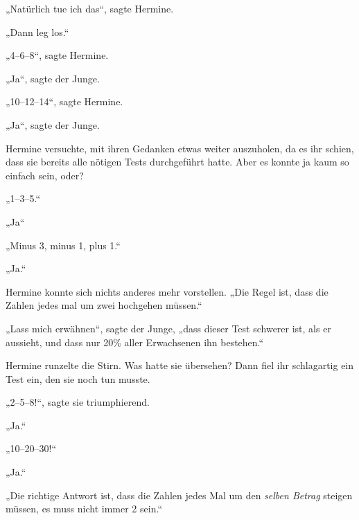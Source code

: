 „Natürlich tue ich das“, sagte Hermine.

„Dann leg los.“

„4–6–8“, sagte Hermine.

„Ja“, sagte der Junge.

„10–12–14“, sagte Hermine.

„Ja“, sagte der Junge.

Hermine versuchte, mit ihren Gedanken etwas weiter auszuholen, da es ihr schien, dass sie bereits alle nötigen Tests durchgeführt hatte. Aber es konnte ja kaum so einfach sein, oder?

„1–3–5.“

„Ja“

„Minus 3, minus 1, plus 1.“

„Ja.“

Hermine konnte sich nichts anderes mehr vorstellen. „Die Regel ist, dass die Zahlen jedes mal um zwei hochgehen müssen.“

„Lass mich erwähnen“, sagte der Junge, „dass dieser Test schwerer ist, als er aussieht, und dass nur 20\% aller Erwachsenen ihn bestehen.“

Hermine runzelte die Stirn. Was hatte sie übersehen? Dann fiel ihr schlagartig ein Test ein, den sie noch tun musste.

„2–5–8!“, sagte sie triumphierend.

„Ja.“

„10–20–30!“

„Ja.“

„Die richtige Antwort ist, dass die Zahlen jedes Mal um den \emph{selben Betrag} steigen müssen, es muss nicht immer 2 sein.“


